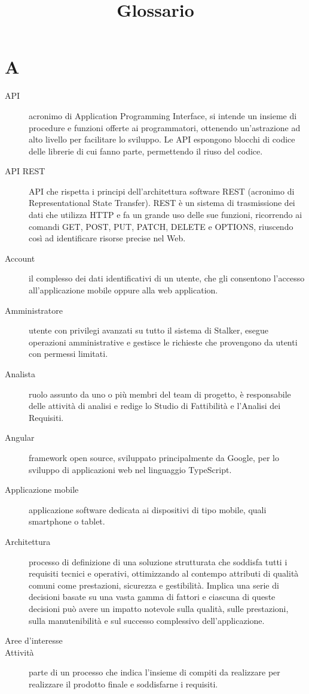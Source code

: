 \documentclass{article}
\title{Glossario}
\begin{document}



\section{A}
\begin{description}
  \item[API] acronimo di Application Programming Interface, si intende un insieme di procedure e funzioni offerte ai programmatori, ottenendo un'astrazione ad alto livello per facilitare lo sviluppo. Le API espongono blocchi di codice delle librerie di cui fanno parte, permettendo il riuso del codice.
  \item[API REST] API che rispetta i principi dell'architettura software REST (acronimo di Representational State Transfer). REST è un sistema di trasmissione dei dati che utilizza HTTP e fa un grande uso delle sue funzioni, ricorrendo ai comandi GET, POST, PUT, PATCH, DELETE e OPTIONS, riuscendo così ad identificare risorse precise nel Web.
  \item[Account] il complesso dei dati identificativi di un utente, che gli consentono l'accesso all'applicazione mobile oppure alla web application.
  \item[Amministratore] utente con privilegi avanzati su tutto il sistema di Stalker, esegue operazioni amministrative e gestisce le richieste che provengono da utenti con permessi limitati.
  \item[Analista] ruolo assunto da uno o più membri del team di progetto, è responsabile delle attività di analisi e redige lo Studio di Fattibilità e l'Analisi dei Requisiti.
  \item[Angular] framework open source, sviluppato principalmente da Google, per lo sviluppo di applicazioni web nel linguaggio TypeScript.
  \item[Applicazione mobile] applicazione software dedicata ai dispositivi di tipo mobile, quali smartphone o tablet.
  \item[Architettura] processo di definizione di una soluzione strutturata che soddisfa tutti i requisiti tecnici e operativi, ottimizzando al contempo attributi di qualità comuni come prestazioni, sicurezza e gestibilità. Implica una serie di decisioni basate su una vasta gamma di fattori e ciascuna di queste decisioni può avere un impatto notevole sulla qualità, sulle prestazioni, sulla manutenibilità e sul successo complessivo dell'applicazione.
  \item[Aree d'interesse] 
  \item[Attività] parte di un processo che indica l'insieme di compiti da realizzare per realizzare il prodotto finale e soddisfarne i requisiti.
\end{description}
\newpage
\end{document}
